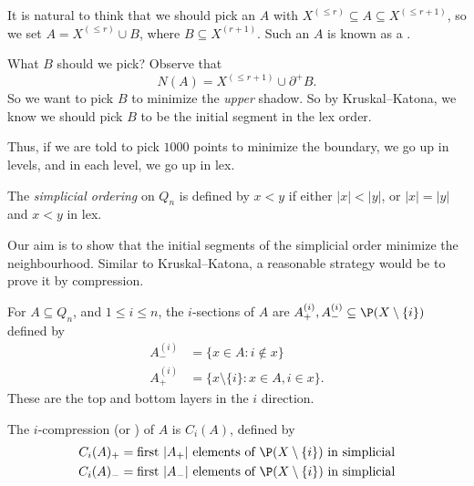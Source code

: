 \documentclass[a4paper]{article}
\begin{document}
It is natural to think that we should pick an $A$ with $X^{(\leq r)} \subseteq A \subseteq X^{(\leq r + 1)}$, so we set $A = X^{(\leq r)} \cup B$, where $B \subseteq X^{(r + 1)}$. Such an $A$ is known as a .

What $B$ should we pick? Observe that
\[
  N(A) = X^{(\leq r + 1)} \cup \partial^+ B.
\]
So we want to pick $B$ to minimize the \emph{upper} shadow. So by Kruskal--Katona, we know we should pick $B$ to be the initial segment in the lex order.

Thus, if we are told to pick $1000$ points to minimize the boundary, we go up in levels, and in each level, we go up in lex.
\begin{defi}
  The \emph{simplicial ordering} on $Q_n$ is defined by $x < y$ if either $|x| < |y|$, or $|x| = |y|$ and $x < y$ in lex.
\end{defi}
Our aim is to show that the initial segments of the simplicial order minimize the neighbourhood. Similar to Kruskal--Katona, a reasonable strategy would be to prove it by compression.

For $A \subseteq Q_n$, and $1 \leq i \leq n$, the $i$-sections of $A$ are $A_+^{(i)}, A_-^{(i)} \subseteq \P(X\setminus \{i\})$ defined by
\begin{align*}
  A_-^{(i)} &= \{x \in A: i \not\in x\}\\
  A_+^{(i)} &= \{x \setminus \{i\}: x \in A, i \in x\}.
\end{align*}
These are the top and bottom layers in the $i$ direction.

The $i$-compression (or ) of $A$ is $C_i(A)$, defined by
\begin{align*}
  C_i(A)_+ &= \text{first $|A_+|$ elements of $\P(X \setminus \{i\})$ in simplicial}\\
  C_i(A)_- &= \text{first $|A_-|$ elements of $\P(X \setminus \{i\})$ in simplicial}
\end{align*}
\end{document}

